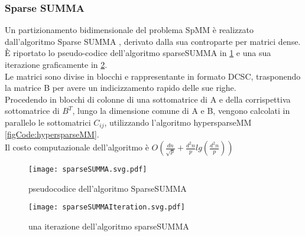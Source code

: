 \subsubsection{Sparse SUMMA}
Un partizionamento bidimensionale del problema SpMM è realizzato
dall'algoritmo Sparse SUMMA \cite{sparseSUMMA}, derivato dalla sua
controparte per matrici dense.\\
È riportato lo pseudo-codice dell'algoritmo sparseSUMMA 
in \ref{figCode:sparseSUMMA} e una sua iterazione graficamente in
\ref{fig:sparseSUMMAIteration}.\\
Le matrici sono divise in blocchi e rappresentante in formato DCSC,
trasponendo la matrice B per avere un indicizzamento rapido delle sue righe.\\
Procedendo in blocchi di colonne di una sottomatrice di A e della corrispettiva
sottomatrice di $B^T$, lungo la dimensione comune di A e B,
vengono calcolati in parallelo le sottomatrici $C_{ij}$, 
utilizzando l'algoritmo hypersparseMM \ref{figCode:hypersparseMM}.\\
Il costo computazionale dell'algoritmo è 
$O(\frac{dn}{\sqrt{p}}+\frac{d^2n}{p}lg(\frac{d^2n}{p}))$
\begin{figure}[H]
  \centering \texttt{[image: sparseSUMMA.svg.pdf]} 
  \caption[pseudocodice sparseSUMMA] {pseudocodice dell'algoritmo SparseSUMMA}
  \decoRule \label{figCode:sparseSUMMA}
\end{figure}
\begin{figure}[H]
  \centering \texttt{[image: sparseSUMMAIteration.svg.pdf]}
  \caption[rappresentante sparseSUMMA]{una iterazione dell'algoritmo sparseSUMMA}
  \decoRule \label{fig:sparseSUMMAIteration}
\end{figure}

